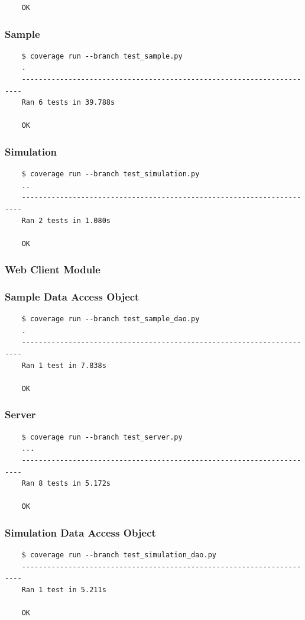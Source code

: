 \documentclass[a4paper,11pt]{article}
\begin{document}
\begin{appendices}
\begin{verbatim}
    OK
\end{verbatim}

\subsubsection*{{\hspace{6mm}}Sample}
\begin{verbatim}
    $ coverage run --branch test_sample.py
    .
    ----------------------------------------------------------------------
    Ran 6 tests in 39.788s

    OK
\end{verbatim}

\subsubsection*{{\hspace{6mm}}Simulation}
\begin{verbatim}
    $ coverage run --branch test_simulation.py
    ..
    ----------------------------------------------------------------------
    Ran 2 tests in 1.080s

    OK
\end{verbatim}

\subsubsection{Web Client Module}
\subsubsection*{{\hspace{6mm}}Sample Data Access Object}
\begin{verbatim}
    $ coverage run --branch test_sample_dao.py 
    .
    ----------------------------------------------------------------------
    Ran 1 test in 7.838s

    OK
\end{verbatim}

\subsubsection*{{\hspace{6mm}}Server}
\begin{verbatim}
    $ coverage run --branch test_server.py
    ...
    ----------------------------------------------------------------------
    Ran 8 tests in 5.172s

    OK
\end{verbatim}

\subsubsection*{{\hspace{6mm}}Simulation Data Access Object}
\begin{verbatim}
    $ coverage run --branch test_simulation_dao.py
    ----------------------------------------------------------------------
    Ran 1 test in 5.211s

    OK
\end{verbatim}

\end{appendices}
\end{document}
